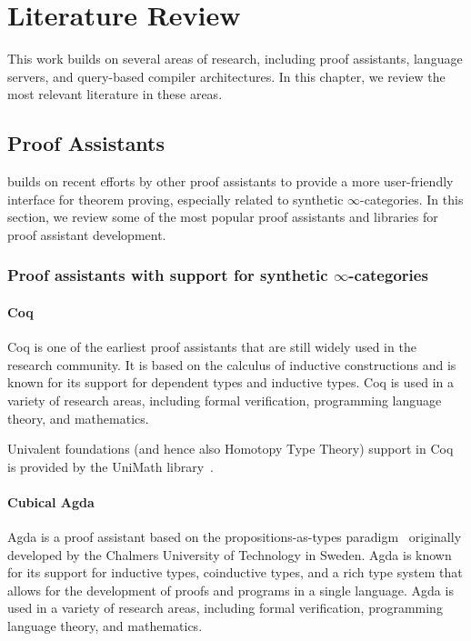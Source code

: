 \chapter{Literature Review}
\label{chap:lr}

This work builds on several areas of research, including proof assistants, language servers,
and query-based compiler architectures.
In this chapter, we review the most relevant literature in these areas.

\section{Proof Assistants}

\Rzk{} builds on recent efforts by other proof assistants to provide a more user-friendly interface for theorem proving,
especially related to synthetic $\infty$-categories.
In this section, we review some of the most popular proof assistants and libraries for proof assistant development.

\subsection{Proof assistants with support for synthetic $\infty$-categories}

\subsubsection{Coq}

Coq \cite{huet1997coq} is one of the earliest proof assistants that are still widely used in the research community.
It is based on the calculus of inductive constructions and is known for its support for dependent types and inductive types.
Coq is used in a variety of research areas, including formal verification, programming language theory, and mathematics.

Univalent foundations (and hence also Homotopy Type Theory) support in Coq is provided by the UniMath library~\cite{DanielGrayson2024}\cite{MacPherson2019}.

\subsubsection{Cubical Agda}

Agda \cite{BoveDybjerNorell2009} is a proof assistant based on the propositions-as-types paradigm~\cite{Wadler2015} originally developed by the Chalmers University of Technology in Sweden.
Agda is known for its support for inductive types, coinductive types, and a rich type system that allows for the
development of proofs and programs in a single language.
Agda is used in a variety of research areas, including formal verification, programming language theory, and mathematics.

